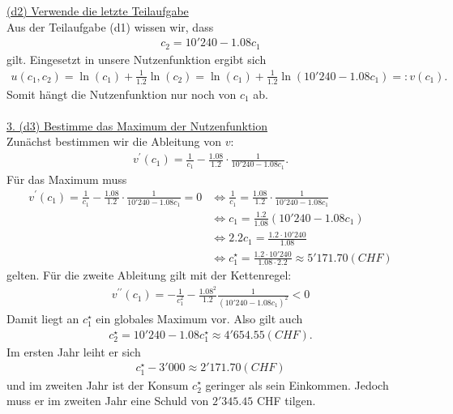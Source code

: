 \newpage
\underline{(d2) Verwende die letzte Teilaufgabe}\\
Aus der Teilaufgabe (d1) wissen wir, dass
\begin{align*}
c_2 = 10'240 -1.08 c_1
\end{align*}
gilt. Eingesetzt in unsere Nutzenfunktion ergibt sich
\begin{align*}
u(c_1,c_2) 
=
\ln(c_1) + \frac{1}{1.2} \ln(c_2)
=
\ln(c_1) + \frac{1}{1.2} \ln(10'240 -1.08 c_1)
=: v(c_1).
\end{align*}
Somit hängt die Nutzenfunktion nur noch von $ c_1 $ ab.\\
\\
\underline{3. (d3) Bestimme das Maximum der Nutzenfunktion}\\
Zunächst bestimmen wir die Ableitung von $ v $:
\begin{align*}
v^\prime( c_1 ) 
=
\frac{1}{c_1}- \frac{1.08}{1.2 }\cdot \frac{1}{10'240 - 1.08 c_1}.
\end{align*}
Für das Maximum muss
\begin{align*}
v^\prime(c_1) =  \frac{1}{c_1}- \frac{1.08}{1.2 }\cdot \frac{1}{10'240 - 1.08 c_1} = 0
&\Leftrightarrow
\frac{1}{c_1} =  \frac{1.08}{1.2 }\cdot \frac{1}{10'240 - 1.08 c_1}\\
&\Leftrightarrow
c_1 = \frac{1.2}{1.08}(10'240 - 1.08 c_1)\\
&\Leftrightarrow
2.2 c_1 = \frac{1.2 \cdot 10'240}{1.08}\\
&\Leftrightarrow
c^\star_1 = \frac{1.2 \cdot 10'240}{1.08 \cdot 2.2} \approx 5'171.70 (CHF)
\end{align*}
gelten. Für die zweite Ableitung gilt mit der Kettenregel:
\begin{align*}
v^{\prime \prime}(c_1)
=
- \frac{1}{c_1^2} - \frac{1.08^2}{1.2} \frac{1}{(10'240 - 1.08 c_1)^2} < 0
\end{align*}
Damit liegt an $ c_1^\star  $ ein globales Maximum vor.
Also gilt auch 
\begin{align*}
c_2^\star = 10'240 - 1.08 c_1^\star
\approx
4'654.55 (CHF).
\end{align*}
Im ersten Jahr leiht er sich 
\begin{align*}
c_1^\star - 3'000 \approx 2'171.70 (CHF)
\end{align*}
und im zweiten Jahr ist der Konsum $ c_2^\star $ geringer als sein Einkommen.
Jedoch muss er im zweiten Jahr eine Schuld von $ 2'345.45 $ CHF
tilgen.
\newpage